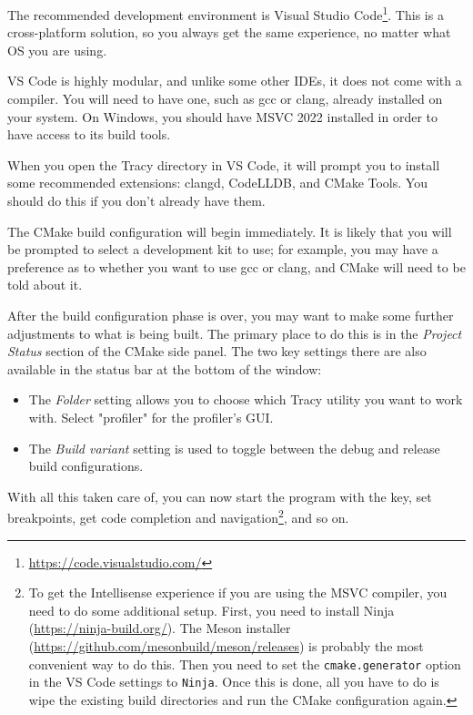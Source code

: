 \documentclass[hidelinks,titlepage,a4paper,twoside]{article}
\begin{document}
The recommended development environment is Visual Studio Code\footnote{\url{https://code.visualstudio.com/}}. This is a cross-platform solution, so you always get the same experience, no matter what OS you are using.

VS Code is highly modular, and unlike some other IDEs, it does not come with a compiler. You will need to have one, such as gcc or clang, already installed on your system. On Windows, you should have MSVC 2022 installed in order to have access to its build tools.

When you open the Tracy directory in VS Code, it will prompt you to install some recommended extensions: clangd, CodeLLDB, and CMake Tools. You should do this if you don't already have them.

The CMake build configuration will begin immediately. It is likely that you will be prompted to select a development kit to use; for example, you may have a preference as to whether you want to use gcc or clang, and CMake will need to be told about it.

After the build configuration phase is over, you may want to make some further adjustments to what is being built. The primary place to do this is in the \emph{Project Status} section of the CMake side panel. The two key settings there are also available in the status bar at the bottom of the window:

\begin{itemize}
\item The \emph{Folder} setting allows you to choose which Tracy utility you want to work with. Select "profiler" for the profiler's GUI.
\item The \emph{Build variant} setting is used to toggle between the debug and release build configurations.
\end{itemize}

With all this taken care of, you can now start the program with the  key, set breakpoints, get code completion and navigation\footnote{To get the Intellisense experience if you are using the MSVC compiler, you need to do some additional setup. First, you need to install Ninja (\url{https://ninja-build.org/}). The Meson installer (\url{https://github.com/mesonbuild/meson/releases}) is probably the most convenient way to do this. Then you need to set the \texttt{cmake.generator} option in the VS Code settings to \texttt{Ninja}. Once this is done, all you have to do is wipe the existing build directories and run the CMake configuration again.}, and so on.
\end{document}
